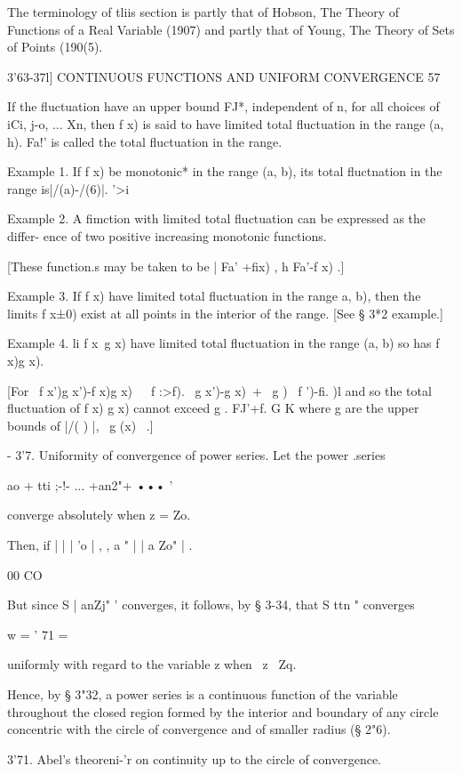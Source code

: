 The terminology of tliis section is partly that of Hobson, The Theory
of Functions of a Real Variable (1907) and partly that of Young, The
Theory of Sets of Points (190(5).



3'63-37l] CONTINUOUS FUNCTIONS AND UNIFORM CONVERGENCE 57

If the fluctuation have an upper bound FJ*, independent of n, for all
choices of iCi, j-o, ... Xn, then f x) is said to have limited total
fluctuation in the range (a, h). Fa!' is called the total fluctuation
in the range.

Example 1. If f x) be monotonic* in the range (a, b), its total
fluctnation in the range is|/(a)-/(6)|. '>i

Example 2. A fimction with limited total fluctuation can be expressed
as the differ- ence of two positive increasing monotonic functions.

[These function.s may be taken to be | Fa' +fix) , h Fa'-f x) .]

Example 3. If f x) have limited total fluctuation in the range a, b),
then the limits f x±0) exist at all points in the interior of the
range. [See § 3*2 example.]

Example 4. li f x\ g x) have limited total fluctuation in the range
(a, b) so has f x)g x).

[For \ f x')g x')-f x)g x)\ \ \ f :>f). \ g x')-g x)\ + \ g ) \ f
')-fi. )l and so the total fluctuation of f x) g x) cannot exceed g .
FJ'+f. G K where g are the upper bounds of |/( ) |, \ g (x) \ .]

- 3'7. Uniformity of convergence of power series. Let the power
.series

ao + tti ;-!- ... +an2"+ ••• '

converge absolutely when z = Zo.

Then, if | | | 'o | , , a " | | a Zo" | .

00 CO

But since S | anZj" ' converges, it follows, by § 3-34, that S ttn "
converges

w = ' 71 =

uniformly with regard to the variable z when \ z \ Zq.

Hence, by § 3"32, a power series is a continuous function of the
variable throughout the closed region formed by the interior and
boundary of any circle concentric with the circle of convergence and
of smaller radius (§ 2"6).

  3'71. Abel's theoreni-'r on continuity up to the circle of
convergence.

